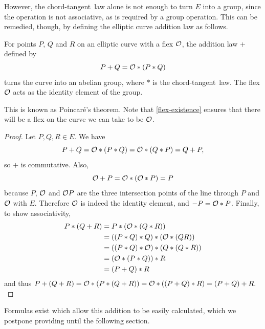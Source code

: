 However, the chord-tangent~law alone is not enough to turn $E$ into a group, since the operation is not associative, as is required by a group operation.
This can be remedied, though, by defining the elliptic curve addition law as follows.
\begin{theorem}
	For points $P$, $Q$ and $R$ on an elliptic curve with a flex $\mathcal{O}$, the addition law $+$ defined by
	$$P + Q = \mathcal{O} * (P * Q)$$
	turns the curve into an abelian group, where $*$ is the chord-tangent~law.
	The flex $\mathcal{O}$ acts as the identity element of the group.
\end{theorem}
This is known as Poincaré's theorem.
Note that \cref{flex-existence} ensures that there will be a flex on the curve we can take to be $\mathcal{O}$.
\begin{proof}
	Let $P,Q,R \in E$.
	We have
	$$P + Q = \mathcal{O} * (P * Q) = \mathcal{O} * (Q * P) = Q + P,$$
	so $+$ is commutative.
	Also,
	$$\mathcal{O} + P = \mathcal{O} * (\mathcal{O} * P) = P$$
	because $P$, $\mathcal{O}$ and $\mathcal{O} P$ are the three intersection points of the line through $P$ and $\mathcal{O}$ with $E$.
	Therefore $\mathcal{O}$ is indeed the identity element, and $-P = \mathcal{O} * P$.
	Finally, to show associativity,
	\begin{align*}
		P * (Q + R) &= P * (\mathcal{O} * ( Q * R))\\
		&= ((P*Q)*Q)*(\mathcal{O}*(QR))\\
		&= ((P*Q)*\mathcal{O})*(Q*(Q*R))\\
		&= (\mathcal{O} * (P*Q))*R\\
		&= (P + Q) * R
	\end{align*}
	and thus $P + (Q + R) = \mathcal{O} * (P * (Q + R)) = \mathcal{O} *((P + Q) * R) = (P + Q) + R.$
\end{proof}

Formulas exist which allow this addition to be easily calculated, which we postpone providing until the following section.
